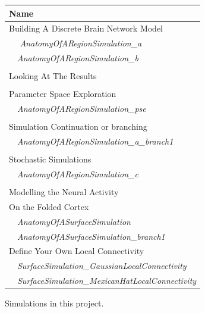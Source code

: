 \documentclass{tufte-handout}
\begin{document}
\begin{margintable}
  \centering
  \selectfont
  \begin{tabular}{l}
    \toprule
    Name \\
    \midrule
    \multicolumn{1}{l}{Building A Discrete Brain Network Model }\\
    $\quad$ \textit{AnatomyOfARegionSimulation\_a} \\
    $\quad$\textit{AnatomyOfARegionSimulation\_b}  \\ 
    \\
    \multicolumn{1}{l}{Looking At The Results}\\
    \\
    \multicolumn{1}{l}{Parameter Space Exploration}\\
     $\quad$\textit{AnatomyOfARegionSimulation\_pse} \\
    \\
    \multicolumn{1}{l}{Simulation Continuation or branching}\\
     $\quad$\textit{AnatomyOfARegionSimulation\_a\_branch1} \\
    \\
    \multicolumn{1}{l}{Stochastic Simulations}\\
     $\quad$\textit{AnatomyOfARegionSimulation\_c}  \\
    \\
     \multicolumn{1}{l}{Modelling the Neural Activity}\\
     \multicolumn{1}{l}{On the Folded Cortex}\\
    $\quad$\textit{AnatomyOfASurfaceSimulation} \\
    $\quad$\textit{AnatomyOfASurfaceSimulation\_branch1}
    \\
    \multicolumn{1}{l}{Define Your Own Local Connectivity}\\
      $\quad$\textit{SurfaceSimulation\_GaussianLocalConnectivity} \\
      $\quad$\textit{SurfaceSimulation\_MexicanHatLocalConnectivity}\\
    \bottomrule
  \end{tabular}
  \caption{Simulations in this project.}
  \label{tab:normaltab}
\end{margintable}
\end{document}
